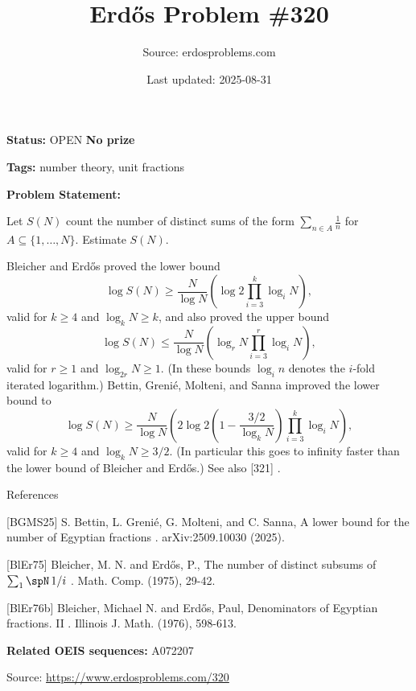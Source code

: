 \documentclass{article}
\title{Erd\H{o}s Problem \#320}
\date{Last updated: 2025-08-31}
\author{Source: erdosproblems.com}
\begin{document}
\maketitle

\noindent\textbf{Status:} OPEN \quad \textbf{No prize}

\noindent\textbf{Tags:} number theory, unit fractions

\medskip

\noindent\textbf{Problem Statement:}

Let $S(N)$ count the number of distinct sums of the form $\sum_{n\in A}\frac{1}{n}$ for $A\subseteq \{1,\ldots,N\}$. Estimate $S(N)$.




Bleicher and Erd\H{o}s \cite{BlEr75} proved the lower bound\[\log S(N)\geq \frac{N}{\log N}\left(\log 2\prod_{i=3}^k\log_iN\right),\]valid for $k\geq 4$ and $\log_kN\geq k$, and also \cite{BlEr76b} proved the upper bound\[\log S(N)\leq \frac{N}{\log N}\left(\log_r N \prod_{i=3}^r \log_iN\right),\]valid for $r\geq 1$ and $\log_{2r}N\geq 1$. (In these bounds $\log_in$ denotes the $i$-fold iterated logarithm.) Bettin, Greni\'{e}, Molteni, and Sanna \cite{BGMS25} improved the lower bound to\[\log S(N) \geq \frac{N}{\log N}\left(2\log 2\left(1-\frac{3/2}{\log_kN}\right)\prod_{i=3}^k\log_iN\right),\]valid for $k\geq 4$ and $\log_kN\geq 3/2$. (In particular this goes to infinity faster than the lower bound of Bleicher and Erd\H{o}s.) See also [321] .




References

[BGMS25] S. Bettin, L. Greni\'{e}, G. Molteni, and C. Sanna, A lower bound for the number of Egyptian fractions . arXiv:2509.10030 (2025).

[BlEr75] Bleicher, M. N. and Erd\H{o}s, P., The number of distinct subsums of $\sum \sb{1}\spN\,1/i$ . Math. Comp. (1975), 29-42.

[BlEr76b] Bleicher, Michael N. and Erd\H{o}s, Paul, Denominators of Egyptian fractions. II . Illinois J. Math. (1976), 598-613.

\noindent\textbf{Related OEIS sequences:} A072207


\bigskip
\noindent\small{Source: \url{https://www.erdosproblems.com/320}}
\end{document}
